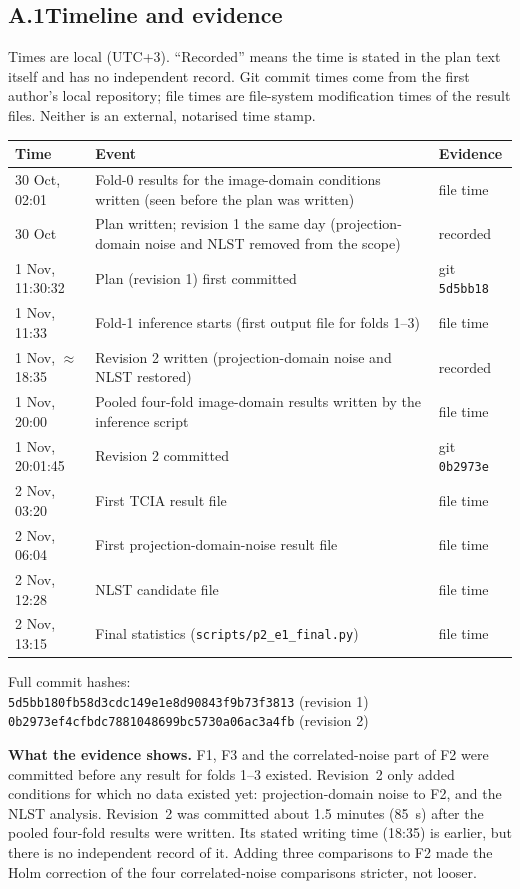 \subsection*{A.1\quad Timeline and evidence}
Times are local (UTC+3). ``Recorded'' means the time is stated in the plan text itself and has no independent record.
Git commit times come from the first author's local repository; file times are file-system modification times of the result files.
Neither is an external, notarised time stamp.

\smallskip
\begin{tabularx}{\linewidth}{@{}l X l@{}}
\toprule
Time & Event & Evidence \\
\midrule
30 Oct, 02:01 & Fold-0 results for the image-domain conditions written (seen before the plan was written) & file time \\
30 Oct & Plan written; revision 1 the same day (projection-domain noise and NLST removed from the scope) & recorded \\
1 Nov, 11:30:32 & Plan (revision 1) first committed & git \texttt{5d5bb18} \\
1 Nov, 11:33 & Fold-1 inference starts (first output file for folds 1--3) & file time \\
1 Nov, $\approx$18:35 & Revision 2 written (projection-domain noise and NLST restored) & recorded \\
1 Nov, 20:00 & Pooled four-fold image-domain results written by the inference script & file time \\
1 Nov, 20:01:45 & Revision 2 committed & git \texttt{0b2973e} \\
2 Nov, 03:20 & First TCIA result file & file time \\
2 Nov, 06:04 & First projection-domain-noise result file & file time \\
2 Nov, 12:28 & NLST candidate file & file time \\
2 Nov, 13:15 & Final statistics (\texttt{scripts/p2\_e1\_final.py}) & file time \\
\bottomrule
\end{tabularx}

\smallskip
Full commit hashes:\\
\texttt{5d5bb180fb58d3cdc149e1e8d90843f9b73f3813} (revision 1)\\
\texttt{0b2973ef4cfbdc7881048699bc5730a06ac3a4fb} (revision 2)

\textbf{What the evidence shows.} F1, F3 and the correlated-noise part of F2 were committed before any result for folds 1--3
existed. Revision~2 only added conditions for which no data existed yet: projection-domain noise to F2, and the NLST analysis.
Revision~2 was committed about 1.5 minutes (85~s) after the pooled four-fold results were written. Its stated writing time (18:35) is earlier,
but there is no independent record of it. Adding three comparisons to F2 made the Holm correction of the four correlated-noise
comparisons stricter, not looser.

